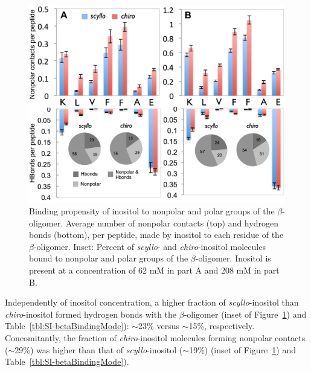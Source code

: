 \begin{figure}
\centering
\includegraphics[width=15cm]{figures/results2/inos2_figures_beta_residues_revised.pdf}
\caption[Binding propensity of inositol to nonpolar and polar groups of the $\beta$-oligomer]{Binding propensity of inositol to nonpolar and polar groups of the $\beta$-oligomer. Average number of nonpolar contacts (top) and hydrogen bonds (bottom), per peptide, made by inositol to each residue of the $\beta$-oligomer. Inset: Percent of \emph{scyllo}- and \emph{chiro}-inositol molecules bound to nonpolar and polar groups of the $\beta$-oligomer.  Inositol is present at a concentration of 62 mM in part A and 208 mM in part B.}
\label{fig:beta_residue_binding}
\end{figure}

Independently of inositol concentration, a higher fraction of \emph{scyllo}-inositol than \emph{chiro}-inositol formed hydrogen bonds with the $\beta$-oligomer (inset of Figure~\ref{fig:beta_residue_binding}) and Table~\ref{tbl:SI-betaBindingMode}):  
$\sim$23\% versus $\sim$15\%, respectively. Concomitantly, the fraction of \emph{chiro}-inositol molecules forming nonpolar contacts ($\sim$29\%) was higher than that of \emph{scyllo}-inositol ($\sim$19\%) (inset of Figure~\ref{fig:beta_residue_binding}) and Table~\ref{tbl:SI-betaBindingMode}).

